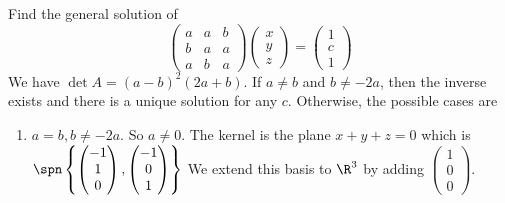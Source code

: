 \documentclass[a4paper]{article}
\begin{document}
\begin{eg}
  Find the general solution of
  \[
    \begin{pmatrix}
      a & a & b\\
      b & a & a\\
      a & b & a
    \end{pmatrix}
    \begin{pmatrix}
      x\\y\\z
    \end{pmatrix}
    =\begin{pmatrix}
      1\\c\\1
    \end{pmatrix}
  \]
  We have $\det A = (a - b)^2 (2a + b)$. If $a \not= b$ and $b \not= -2a$, then the inverse exists and there is a unique solution for any $c$. Otherwise, the possible cases are
  \begin{enumerate}
    \item $a = b, b \not= -2a$. So $a\not= 0$. The kernel is the plane $x + y + z = 0$ which is $\spn\left\{
        \begin{pmatrix}
          -1\\1\\0
        \end{pmatrix},
        \begin{pmatrix}
          -1\\ 0\\ 1
        \end{pmatrix}\right\}$
        We extend this basis to $\R^3$ by adding $
        \begin{pmatrix}
          1\\0\\0
        \end{pmatrix}$.


\end{enumerate}
\end{eg}
\end{document}
